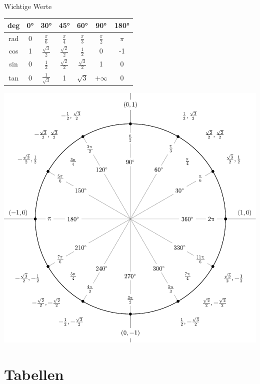 \documentclass[a4paper,fontsize = 7pt]{scrartcl}
\begin{document}
\begin{mainbox}{Wichtige Werte}
\begin{center} 
 \begin{tabular}{c|cccccc}
  deg & 0° & 30° & 45° & 60° & 90° & 180° \\
  \midrule
  rad & 0 & $\frac{\pi}{6}$ & $\frac{\pi}{4}$ & $\frac{\pi}{3}$ & $\frac{\pi}{2}$ & $\pi$ \\
  cos & 1 & $\frac{\sqrt{3}}{2}$ & $\frac{\sqrt{2}}{2}$ & $\frac{1}{2}$ & 0 & -1 \\
  sin & 0 & $\frac{1}{2}$ & $\frac{\sqrt{2}}{2}$ & $\frac{\sqrt{3}}{2}$ & 1 & 0 \\
  tan & 0 & $\frac{1}{\sqrt{3}}$ & 1 & $\sqrt{3}$ & $+\infty$ & 0 \\
 \end{tabular}
\end{center}
\end{mainbox}

\begin{center}
\includegraphics[width=\linewidth]{degrees_circle.pdf}
  
\end{center}

\section{Tabellen}
\end{document}
